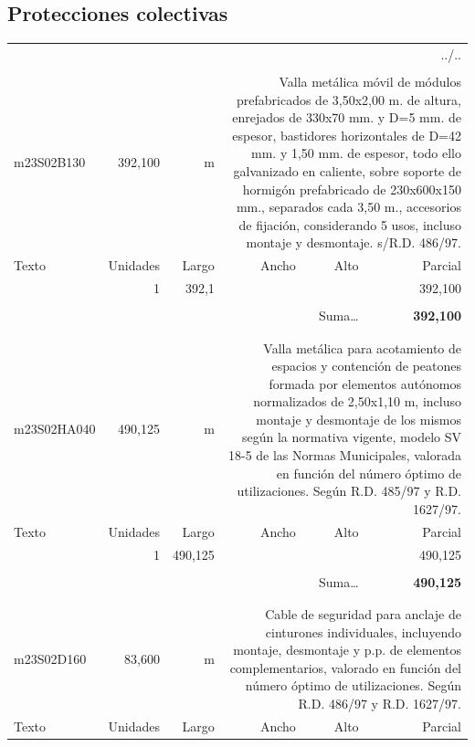 \documentclass{book}%
\begin{document}
%
\subsection{Protecciones colectivas}%
\begin{longtable}{lrrrrr}%
\multicolumn{6}{r}{../..}\\%
\endfoot%
\endlastfoot%
&&&&&\\%
m23S02B130&   392,100& m&\multicolumn{3}{p{6cm}}{\scriptsize Valla metálica móvil de módulos prefabricados de 3,50x2,00 m. de altura, enrejados de 330x70 mm. y D=5 mm. de espesor, bastidores horizontales de D=42 mm. y 1,50 mm. de espesor, todo ello galvanizado en caliente, sobre soporte de hormigón prefabricado de 230x600x150 mm., separados cada 3,50 m., accesorios de fijación, considerando 5 usos, incluso montaje y desmontaje. s/R.D. 486/97.\normalsize}\\%
Texto&Unidades&Largo&Ancho&Alto&Parcial\\%
\hline%
\multicolumn{1}{p{3.5cm}}{ }&1&392,1&&&   392,100\\%
&&&&&\\%
\multicolumn{5}{r}{Suma\ldots}&\textbf{   392,100}\\%
\hline%
&&&&&\\%
&&&&&\\%
m23S02HA040&   490,125& m&\multicolumn{3}{p{6cm}}{\scriptsize Valla metálica para acotamiento de espacios y contención de peatones formada por elementos autónomos normalizados de 2,50x1,10 m, incluso montaje y desmontaje de los mismos según la normativa vigente, modelo SV 18-5 de las Normas Municipales, valorada en función del número óptimo de utilizaciones. Según R.D. 485/97 y R.D. 1627/97.\normalsize}\\%
Texto&Unidades&Largo&Ancho&Alto&Parcial\\%
\hline%
\multicolumn{1}{p{3.5cm}}{ }&1&490,125&&&   490,125\\%
&&&&&\\%
\multicolumn{5}{r}{Suma\ldots}&\textbf{   490,125}\\%
\hline%
&&&&&\\%
&&&&&\\%
m23S02D160&    83,600& m&\multicolumn{3}{p{6cm}}{\scriptsize Cable de seguridad para anclaje de cinturones individuales, incluyendo montaje, desmontaje y p.p. de elementos complementarios, valorado en función del número óptimo de utilizaciones. Según R.D. 486/97 y R.D. 1627/97.\normalsize}\\%
Texto&Unidades&Largo&Ancho&Alto&Parcial\\%

\end{longtable}
\end{document}
